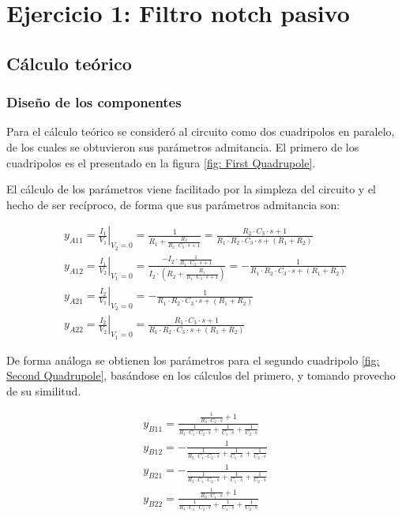 \section{Ejercicio 1: Filtro notch pasivo}
\subsection{C\'alculo te\'orico}
\subsubsection{Dise\~no de los componentes} \label{sec: Components design}
Para el c\'alculo te\'orico se consider\'o al circuito como dos cuadripolos en paralelo, de los cuales se obtuvieron sus par\'ametros admitancia.
El primero de los cuadripolos es el presentado en la figura \ref{fig: First Quadrupole}.


El c\'alculo de los par\'ametros viene facilitado por la simpleza del circuito y el hecho de ser rec\'iproco, de forma que sus par\'ametros admitancia son:

\begin{align}
    \label{eqn: Admittance parameters first quadrupole.}
    y_{A11} = \left. \frac{I_1}{V_1} \right\rvert_{V_2=0} = \frac{1}{R_1 + \frac{R_2}{R_2 \cdot C_3 \cdot s + 1}} = \frac{R_2 \cdot C_3 \cdot s + 1}{R_1 \cdot R_2 \cdot C_3 \cdot s + \left(R_1+R_2\right)} \\
    y_{A12} = \left. \frac{I_1}{V_2} \right\rvert_{V_1=0} = \frac{-I_2 \cdot \frac{1}{R_1 \cdot C_3 \cdot s + 1}}{I_2 \cdot \left(R_2 + \frac{R_1}{R_1 \cdot C_3 \cdot s + 1}\right)} = -\frac{1}{R_1 \cdot R_2 \cdot C_3 \cdot s + \left(R_1+R_2\right)}\\
    y_{A21} = \left. \frac{I_2}{V_1} \right\rvert_{V_2=0} = -\frac{1}{R_1 \cdot R_2 \cdot C_3 \cdot s + \left(R_1+R_2\right)}\\
    y_{A22} = \left. \frac{I_2}{V_2} \right\rvert_{V_1=0} = \frac{R_1 \cdot C_3 \cdot s + 1}{R_1 \cdot R_2 \cdot C_3 \cdot s + \left(R_1+R_2\right)}
\end{align}

De forma an\'aloga se obtienen los par\'ametros para el segundo cuadripolo \ref{fig: Second Quadrupole}, bas\'andose en los c\'alculos del primero, y tomando provecho de su similitud.


\begin{align}
    \label{eqn: Admittance parameters second quadrupole.}
    y_{B11} = \frac{\frac{1}{R_3 \cdot C_2 \cdot s} + 1}{\frac{1}{R_3 \cdot C_1 \cdot C_2 \cdot s} + \frac{1}{C_1 \cdot s} + \frac{1}{C_2 \cdot s}} \\
    y_{B12} = -\frac{1}{\frac{1}{R_3 \cdot C_1 \cdot C_2 \cdot s} + \frac{1}{C_1 \cdot s} + \frac{1}{C_2 \cdot s}}\\
    y_{B21} = -\frac{1}{\frac{1}{R_3 \cdot C_1 \cdot C_2 \cdot s} + \frac{1}{C_1 \cdot s} + \frac{1}{C_2 \cdot s}}\\
    y_{B22} = \frac{\frac{1}{R_3 \cdot C_1 \cdot s} + 1}{\frac{1}{R_3 \cdot C_1 \cdot C_2 \cdot s} + \frac{1}{C_1 \cdot s} + \frac{1}{C_2 \cdot s}}
\end{align}

